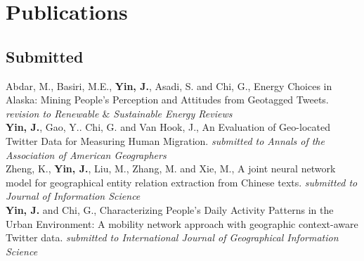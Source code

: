 \documentclass[11pt, a4paper]{article}
\newcommand{\years}[1]{\marginnote{\scriptsize #1}}
\begin{document}
\section*{Publications}
\subsection*{Submitted}
\years{2019} Abdar, M., Basiri, M.E., \textbf{Yin, J.}, Asadi, S. and Chi, G., Energy Choices in Alaska: Mining People's Perception and Attitudes from Geotagged Tweets. \textit{revision to Renewable $\&$ Sustainable Energy Reviews}\\
\years{2019} \textbf{Yin, J.}, Gao, Y.. Chi, G. and Van Hook, J., An Evaluation of Geo-located Twitter Data for Measuring Human Migration. \textit{submitted to Annals of the Association of American Geographers}\\
\years{2019} Zheng, K., \textbf{Yin, J.}, Liu, M., Zhang, M. and Xie, M., A joint neural network model for geographical entity relation extraction from Chinese texts. \textit{submitted to Journal of Information Science}\\
\years{2019}\textbf{Yin, J.} and  Chi, G., Characterizing People’s Daily Activity Patterns in the Urban Environment: A mobility network approach with geographic context-aware Twitter data. \textit{submitted to International Journal of Geographical Information Science}
\end{document}
